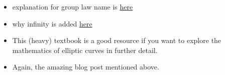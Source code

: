 \documentclass{article}
\begin{document}
\begin{itemize}
    \item explanation for group law name is \href{https://www.math.brown.edu/reschwar/M1540B/elliptic.pdf}{here}
    \item why infinity is added \href{https://crypto.stackexchange.com/questions/70507/in-elliptic-curve-what-does-the-point-at-infinity-look-like}{here}
    \item This (heavy) textbook is a good resource if you want to explore the mathematics of elliptic curves in further detail.
    \item Again, the amazing blog post mentioned above.
\end{itemize}
\end{document}
